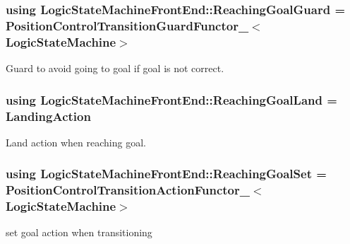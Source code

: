 \hypertarget{classLogicStateMachineFrontEnd_a84fe5b03b104adc3c3406bb0b6ffa190}{
\subsubsection[{Reaching\-Goal\-Guard}]{\setlength{\rightskip}{0pt plus 5cm}using {\bf Logic\-State\-Machine\-Front\-End\-::\-Reaching\-Goal\-Guard} =  {\bf Position\-Control\-Transition\-Guard\-Functor\-\_\-}$<${\bf Logic\-State\-Machine}$>$}}\label{classLogicStateMachineFrontEnd_a84fe5b03b104adc3c3406bb0b6ffa190}


Guard to avoid going to goal if goal is not correct. 

\hypertarget{classLogicStateMachineFrontEnd_a3bec78d997dbc5ae5534c3b49c8127f5}{
\subsubsection[{Reaching\-Goal\-Land}]{\setlength{\rightskip}{0pt plus 5cm}using {\bf Logic\-State\-Machine\-Front\-End\-::\-Reaching\-Goal\-Land} =  {\bf Landing\-Action}}}\label{classLogicStateMachineFrontEnd_a3bec78d997dbc5ae5534c3b49c8127f5}


Land action when reaching goal. 

\hypertarget{classLogicStateMachineFrontEnd_a39babee29ba680422ea922504a465417}{
\subsubsection[{Reaching\-Goal\-Set}]{\setlength{\rightskip}{0pt plus 5cm}using {\bf Logic\-State\-Machine\-Front\-End\-::\-Reaching\-Goal\-Set} =  {\bf Position\-Control\-Transition\-Action\-Functor\-\_\-}$<${\bf Logic\-State\-Machine}$>$}}\label{classLogicStateMachineFrontEnd_a39babee29ba680422ea922504a465417}


set goal action when transitioning 

